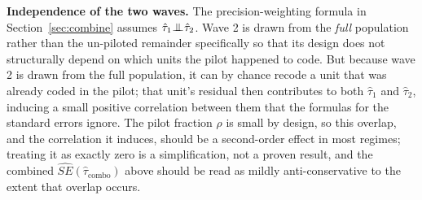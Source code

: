 \documentclass[12pt]{article}
\newcommand{\tauhat}{\hat\tau}
\begin{document}
\textbf{Independence of the two waves.}
The precision-weighting formula in Section~\ref{sec:combine} assumes $\tauhat_1 \indep \tauhat_2$.
Wave 2 is drawn from the \emph{full} population rather than the un-piloted remainder specifically so that its design does not structurally depend on which units the pilot happened to code.
But because wave 2 is drawn from the full population, it can by chance recode a unit that was already coded in the pilot; that unit's residual then contributes to both $\tauhat_1$ and $\tauhat_2$, inducing a small positive correlation between them that the formulas for the standard errors ignore.
The pilot fraction $\rho$ is small by design, so this overlap, and the correlation it induces, should be a second-order effect in most regimes; treating it as exactly zero is a simplification, not a proven result, and the combined $\widehat{SE}(\tauhat_{\text{combo}})$ above should be read as mildly anti-conservative to the extent that overlap occurs.



\end{document}
